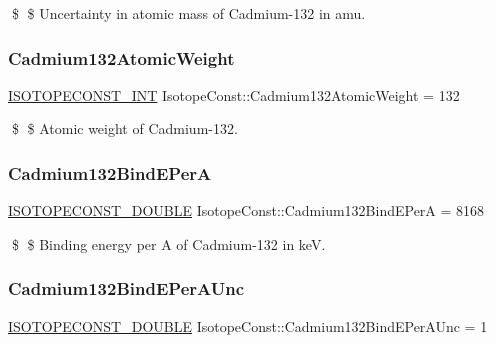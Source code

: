 \$ \$ Uncertainty in atomic mass of Cadmium-\/132 in amu. \mbox{\label{group___isotope_const-_cadmium-_cd132_gadde65c0b377624d2288e742b73a07a87}} 
\subsubsection{\texorpdfstring{Cadmium132\+Atomic\+Weight}{Cadmium132AtomicWeight}}
{\footnotesize\ttfamily \mbox{\hyperlink{group___isotope_const-_macros_ga5f18360b3e99483a35c32d789e62621c}{I\+S\+O\+T\+O\+P\+E\+C\+O\+N\+S\+T\+\_\+\+I\+NT}} Isotope\+Const\+::\+Cadmium132\+Atomic\+Weight = 132}

\$ \$ Atomic weight of Cadmium-\/132. \mbox{\label{group___isotope_const-_cadmium-_cd132_ga80f0043df5c6c5b03188a417e571ceb9}} 
\subsubsection{\texorpdfstring{Cadmium132\+Bind\+E\+PerA}{Cadmium132BindEPerA}}
{\footnotesize\ttfamily \mbox{\hyperlink{group___isotope_const-_macros_ga8f45a7272ce02c0b4c65c44636ed719a}{I\+S\+O\+T\+O\+P\+E\+C\+O\+N\+S\+T\+\_\+\+D\+O\+U\+B\+LE}} Isotope\+Const\+::\+Cadmium132\+Bind\+E\+PerA = 8168}

\$ \$ Binding energy per A of Cadmium-\/132 in keV. \mbox{\label{group___isotope_const-_cadmium-_cd132_ga186c629f53289edd402fba4b5c00143d}} 
\subsubsection{\texorpdfstring{Cadmium132\+Bind\+E\+Per\+A\+Unc}{Cadmium132BindEPerAUnc}}
{\footnotesize\ttfamily \mbox{\hyperlink{group___isotope_const-_macros_ga8f45a7272ce02c0b4c65c44636ed719a}{I\+S\+O\+T\+O\+P\+E\+C\+O\+N\+S\+T\+\_\+\+D\+O\+U\+B\+LE}} Isotope\+Const\+::\+Cadmium132\+Bind\+E\+Per\+A\+Unc = 1}

